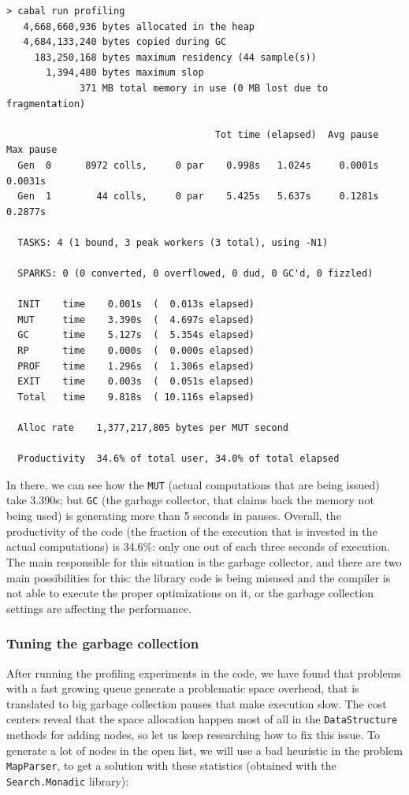 \begin{lstlisting}
> cabal run profiling
   4,668,660,936 bytes allocated in the heap
   4,684,133,240 bytes copied during GC
     183,250,168 bytes maximum residency (44 sample(s))
       1,394,480 bytes maximum slop
             371 MB total memory in use (0 MB lost due to fragmentation)

                                     Tot time (elapsed)  Avg pause  Max pause
  Gen  0      8972 colls,     0 par    0.998s   1.024s     0.0001s    0.0031s
  Gen  1        44 colls,     0 par    5.425s   5.637s     0.1281s    0.2877s

  TASKS: 4 (1 bound, 3 peak workers (3 total), using -N1)

  SPARKS: 0 (0 converted, 0 overflowed, 0 dud, 0 GC'd, 0 fizzled)

  INIT    time    0.001s  (  0.013s elapsed)
  MUT     time    3.390s  (  4.697s elapsed)
  GC      time    5.127s  (  5.354s elapsed)
  RP      time    0.000s  (  0.000s elapsed)
  PROF    time    1.296s  (  1.306s elapsed)
  EXIT    time    0.003s  (  0.051s elapsed)
  Total   time    9.818s  ( 10.116s elapsed)

  Alloc rate    1,377,217,805 bytes per MUT second

  Productivity  34.6% of total user, 34.0% of total elapsed
\end{lstlisting}

In there, we can see how the \texttt{MUT} (actual computations that are being
issued) take 3.390s; but \texttt{GC} (the garbage collector, that claims back
the memory not being used) is generating more than 5 seconds in pauses.
Overall, the productivity of the code (the fraction of the execution that is
invested in the actual computations) is 34.6\%: only one out of each three
seconds of execution. The main responsible for this situation is the garbage
collector, and there are two main possibilities for this: the library code is
being misused and the compiler is not able to execute the proper optimizations
on it, or the garbage collection settings are affecting the performance.\\

\subsubsection{Tuning the garbage collection}

After running the profiling experiments in the code, we have found that
problems with a fast growing queue generate a problematic space overhead, that
is translated to big garbage collection pauses that make execution slow. The
cost centers reveal that the space allocation happen most of all in the
\texttt{DataStructure} methods for adding nodes, so let us keep researching how
to fix this issue. To generate a lot of nodes in the open list, we will use a
bad heuristic in the problem \texttt{MapParser}, to get a solution with these
statistics (obtained with the \texttt{Search.Monadic} library):

